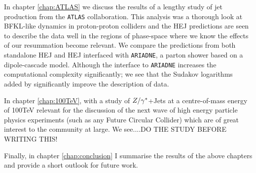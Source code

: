 	In chapter \ref{chap:ATLAS} we discuss the results of a lengthy study of jet production from the \texttt{ATLAS} collaboration.  This analysis was a thorough
	look at BFKL-like dynamics in proton-proton colliders and the HEJ predictions are seen to describe the data well in the regions of phase-space where
	we know the effects of our resummation become relevant.  We compare the predictions from both standalone HEJ and HEJ interfaced with \texttt{ARIADNE}, a
	parton shower based on a dipole-cascade model.  Although the interface to \texttt{ARIADNE} increases the computational complexity significantly; we see that
	the Sudakov logarithms added by significantly improve the description of data.

	In chapter \ref{chap:100TeV}, with a study of ${Z/\gamma^*}$+Jets at a centre-of-mass energy of 100TeV relevant for the discussion of
	the next wave of high energy particle physics experiments (such as any Future Circular Collider) which are of great interest to the community at large.  We see....DO THE STUDY BEFORE
	WRITING THIS!

	Finally, in chapter \ref{chap:conclusion} I summarise the results of the above chapters and provide a short outlook for future work.

